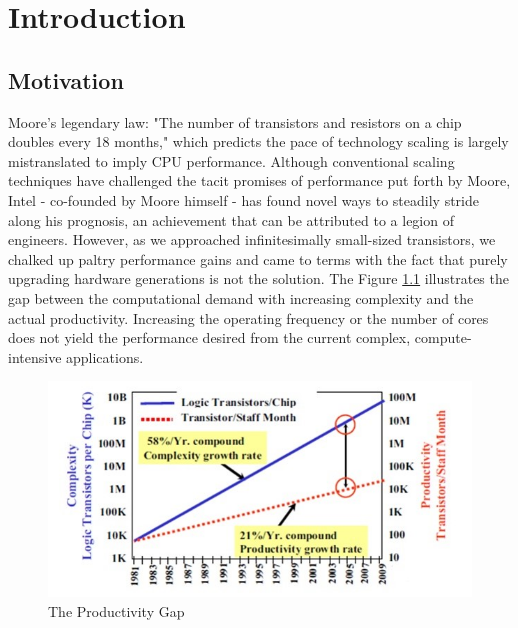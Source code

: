 \chapter{Introduction}
\label{ch1_introduction}
\section{Motivation}
\label{sect1_1}
Moore’s legendary law: "The number of transistors and resistors on a chip doubles every 18 months," which predicts the pace of technology scaling is largely mistranslated to imply CPU performance. Although conventional scaling techniques have challenged the tacit promises of performance put forth by Moore, Intel - co-founded by Moore himself - has found novel ways to steadily stride along his prognosis, an achievement that can be attributed to a legion of engineers. However, as we approached infinitesimally small-sized transistors, we chalked up paltry performance gains and came to terms with the fact that purely upgrading hardware generations is not the solution. 
\newline \newline
The Figure \ref{fig:sematech} illustrates the gap between the computational demand with increasing complexity and the actual productivity. Increasing the operating frequency or the number of cores does not yield the performance desired from the current complex, compute-intensive applications. \newline \newline
\begin{figure}[h!]
  \includegraphics[width=\linewidth]{figures/sematech.jpg}
  \caption{The Productivity Gap
  \cite{industry1999international}}
  \label{fig:sematech}
\end{figure}
